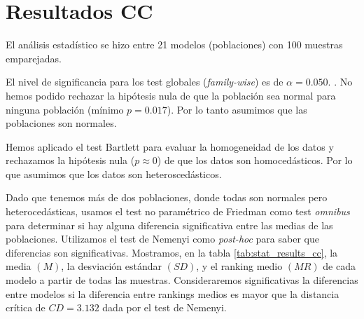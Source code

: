 \documentclass[a4paper,oneside,11pt,leqno]{article}
\begin{document}
	
	\section{Resultados CC}
	\label{sec:results_cc}
	
	El análisis estadístico se hizo entre 21 modelos (poblaciones) con 100 muestras emparejadas.
	
	El nivel de significancia para los test globales (\textit{family-wise}) es de $\alpha=0.050$.
.
	No hemos podido rechazar la hipótesis nula de que la población sea normal para ninguna población (mínimo $p=0.017$). Por lo tanto asumimos que las poblaciones son normales.
	
	Hemos aplicado el test Bartlett para evaluar la homogeneidad de los datos y rechazamos la hipótesis nula ($p\approx 0$) de que los datos son homocedásticos. Por lo que asumimos que los datos son heteroscedásticos.
	
	Dado que tenemos más de dos poblaciones, donde todas son normales pero heterocedásticas, usamos el test no paramétrico de Friedman como test \textit{omnibus} para determinar si hay alguna diferencia significativa entre las medias de las poblaciones. Utilizamos el test de Nemenyi como \textit{post-hoc} para saber que diferencias son significativas. Mostramos, en la tabla \ref{tab:stat_results_cc}, la media $(M)$, la desviación estándar $(SD)$, y el ranking medio $(MR)$ de cada modelo a partir de todas las muestras. Consideraremos significativas la diferencias entre modelos si la diferencia entre rankings medios es mayor que la distancia crítica de $CD=3.132$ dada por el test de Nemenyi.
	
\end{document}
